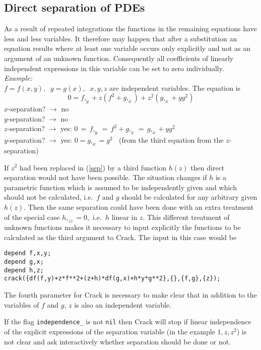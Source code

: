 \documentclass[12pt]{article}
\begin{document}
\subsection{Direct separation of PDEs}
As a result of repeated integrations the functions in the 
remaining equations have less and less variables. It therefore may happen
that after a substitution an equation results where at least one variable
occurs only explicitly and not as an argument of an unknown function.
Consequently all coefficients of linearly independent expressions in this
variable can be set to zero individually. \\
{\em Example:}  \\
$f = f(x,y), \;\; g = g(x), \;\; x,y,z$ are independent variables. 
The equation is
\begin{equation} 
0 = f,_y + z(f^2+g,_x) + z^2(g,_x+yg^2) \label{sep}
\end{equation}
$x$-separation? $\rightarrow$ no  \\
$y$-separation? $\rightarrow$ no  \\
$z$-separation? $\rightarrow$ yes: $0 \,=\, f,_y \,=\, f^2+g,_x \,=\,
g,_x+yg^2$ \\
$y$-separation? $\rightarrow$ yes: $0 = g,_x = g^2\;\;$ 
(from the third equation from the $z$-separation)   

If $z^2$ had been replaced in (\ref{sep}) by a third
function $h(z)$ then direct separation would not have been possible.
The situation changes if $h$ is a parametric function which is
assumed to be independently given and which should not be
calculated, i.e.\ $f$ and $g$ should be calculated for any
arbitrary given $h(z)$. Then the same separation could have been
done with an extra treatment of the special case $h,_{zz} = 0,$
i.e.\ $h$ linear in $z$. This different treatment of unknown functions
makes it necessary to input explicitly the functions to be
calculated as the third argument to {\sc Crack}. The input
in this case would be
\begin{verbatim}
depend f,x,y;
depend g,x;
depend h,z;
crack({df(f,y)+z*f**2+(z+h)*df(g,x)+h*y*g**2},{},{f,g},{z});
\end{verbatim}
The fourth parameter for {\sc Crack} is necessary to make clear that
in addition to the variables of $f$ and $g$, $z$ is also an independent
variable.
 
If the flag {\tt independence\_} is not {\tt nil} then {\sc Crack} will
stop if linear independence of the explicit expressions of the
separation variable (in the example $1,z,z^2$) is not clear and ask 
interactively whether separation should be done or not.
\end{document}
